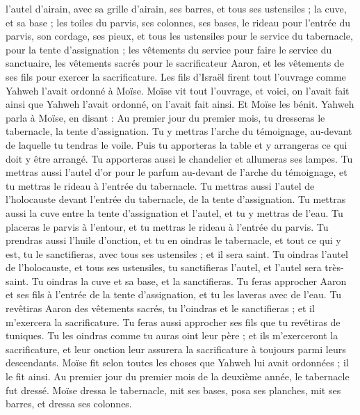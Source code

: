 \begin{multicols}{2}
l'autel d'airain, avec sa grille d'airain, ses barres, et tous ses ustensiles ; la cuve, et sa base ;
les toiles du parvis, ses colonnes, ses bases, le rideau pour l’entrée du parvis, son cordage, ses pieux, et tous les ustensiles pour le service du tabernacle, pour la tente d'assignation ;
les vêtements du service pour faire le service du sanctuaire, les vêtements sacrés pour le sacrificateur Aaron, et les vêtements de ses fils pour exercer la sacrificature.
Les fils d'Israël firent tout l'ouvrage comme Yahweh l'avait ordonné à Moïse.
Moïse vit tout l'ouvrage, et voici, on l'avait fait ainsi que Yahweh l'avait ordonné, on l'avait fait ainsi. Et Moïse les bénit.
\VerseOne{}Yahweh parla à Moïse, en disant :
Au premier jour du premier mois, tu dresseras le tabernacle, la tente d'assignation.
Tu y mettras l'arche du témoignage, au-devant de laquelle tu tendras le voile.
Puis tu apporteras la table et y arrangeras ce qui doit y être arrangé. Tu apporteras aussi le chandelier et allumeras ses lampes.
Tu mettras aussi l'autel d'or pour le parfum au-devant de l'arche du témoignage, et tu mettras le rideau à l'entrée du tabernacle.
Tu mettras aussi l'autel de l'holocauste devant l'entrée du tabernacle, de la tente d'assignation.
Tu mettras aussi la cuve entre la tente d'assignation et l'autel, et tu y mettras de l'eau.
Tu placeras le parvis à l’entour, et tu mettras le rideau à l’entrée du parvis.
Tu prendras aussi l'huile d'onction, et tu en oindras le tabernacle, et tout ce qui y est, tu le sanctifieras, avec tous ses ustensiles ; et il sera saint.
Tu oindras l'autel de l'holocauste, et tous ses ustensiles, tu sanctifieras l'autel, et l'autel sera très-saint.
Tu oindras la cuve et sa base, et la sanctifieras.
Tu feras approcher Aaron et ses fils à l'entrée de la tente d'assignation, et tu les laveras avec de l'eau.
Tu revêtiras Aaron des vêtements sacrés, tu l'oindras et le sanctifieras ; et il m'exercera la sacrificature.
Tu feras aussi approcher ses fils que tu revêtiras de tuniques.
Tu les oindras comme tu auras oint leur père ; et ils m'exerceront la sacrificature, et leur onction leur assurera la sacrificature à toujours parmi leurs descendants.
Moïse fit selon toutes les choses que Yahweh lui avait ordonnées ; il le fit ainsi.
Au premier jour du premier mois de la deuxième année, le tabernacle fut dressé.
Moïse dressa le tabernacle, mit ses bases, posa ses planches, mit ses barres, et dressa ses colonnes.

\end{multicols}
